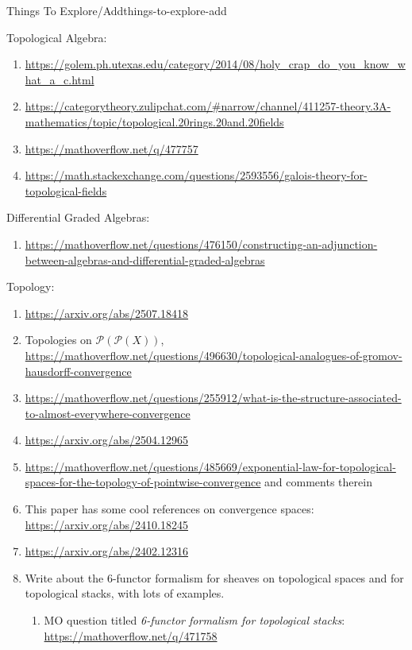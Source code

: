 \begin{remark}{Things To Explore/Add}{things-to-explore-add}
\begin{enumerate}
    \end{enumerate}
    Topological Algebra:
    \begin{enumerate}
        \item \url{https://golem.ph.utexas.edu/category/2014/08/holy\_crap\_do\_you\_know\_what\_a\_c.html}
        \item \url{https://categorytheory.zulipchat.com/#narrow/channel/411257-theory.3A-mathematics/topic/topological.20rings.20and.20fields}
        \item \url{https://mathoverflow.net/q/477757}
        \item \url{https://math.stackexchange.com/questions/2593556/galois-theory-for-topological-fields}
    \end{enumerate}
    Differential Graded Algebras:
    \begin{enumerate}
        \item \url{https://mathoverflow.net/questions/476150/constructing-an-adjunction-between-algebras-and-differential-graded-algebras}
    \end{enumerate}
    Topology:
    \begin{enumerate}
        \item \url{https://arxiv.org/abs/2507.18418}
        \item Topologies on $\mathcal{P}(\mathcal{P}(X))$, \url{https://mathoverflow.net/questions/496630/topological-analogues-of-gromov-hausdorff-convergence}
        \item \url{https://mathoverflow.net/questions/255912/what-is-the-structure-associated-to-almost-everywhere-convergence}
        \item \url{https://arxiv.org/abs/2504.12965}
        \item \url{https://mathoverflow.net/questions/485669/exponential-law-for-topological-spaces-for-the-topology-of-pointwise-convergence} and comments therein
        \item This paper has some cool references on convergence spaces: \url{https://arxiv.org/abs/2410.18245}
        \item \url{https://arxiv.org/abs/2402.12316}
        \item Write about the 6-functor formalism for sheaves on topological spaces and for topological stacks, with lots of examples.
            \begin{enumerate}
                \item MO question titled \emph{6-functor formalism for topological stacks}: \url{https://mathoverflow.net/q/471758}

\end{enumerate}
\end{enumerate}
\end{remark}
